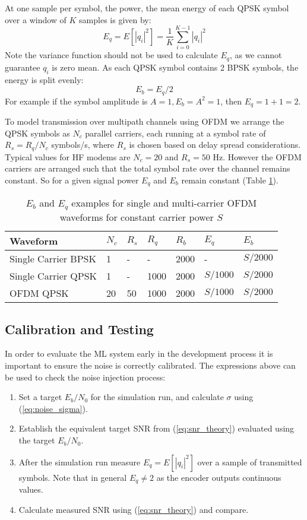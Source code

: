 \documentclass{article}
\begin{document}
At one sample per symbol, the power, the mean energy of each QPSK symbol over a window of $K$ samples is given by:
\begin{equation}
E_q = E[|q_i|^2] = \frac{1}{K}\sum_{i=0}^{K-1}|q_i|^2
\end{equation}
Note the variance function should not be used to calculate $E_q$, as we cannot guarantee $q_i$ is zero mean. As each QPSK symbol contains 2 BPSK symbols, the energy is split evenly:
\begin{equation}
E_b = E_q/2
\end{equation}
For example if the symbol amplitude is $A=1, E_b=A^2=1$, then $E_q=1+1=2$.

To model transmission over multipath channels using OFDM we arrange the QPSK symbols as $N_c$ parallel carriers, each running at a symbol rate of $R_s=R_q/N_c$ symbols/s, where $R_s$ is chosen based on delay spread considerations.  Typical values for HF modems are $N_c=20$ and $R_s=50$ Hz. However the OFDM carriers are arranged such that the total symbol rate over the channel remains constant.  So for a given signal power $E_q$ and $E_b$ remain constant (Table \ref{tab:constant_eb}).

\begin{table} [H]
\centering
\begin{tabular}{l l l l l l l}
 \hline
 Waveform            & $N_c$ & $R_s$ & $R_q$ & $R_b$ & $E_q$ & $E_b$ \\
 \hline
 Single Carrier BPSK & 1     & -  & -    & 2000  & -        & $S/2000$ \\
 Single Carrier QPSK & 1     & -  & 1000 & 2000  & $S/1000$ & $S/2000$ \\
 OFDM QPSK           & 20    & 50 & 1000 & 2000  & $S/1000$ & $S/2000$ \\
 \hline
\end{tabular}
\caption{$E_b$ and $E_q$ examples for single and multi-carrier OFDM waveforms for constant carrier power $S$}
\label{tab:constant_eb}
\end{table}

\subsection{Calibration and Testing}

In order to evaluate the ML system early in the development process it is important to ensure the noise is correctly calibrated. The expressions above can be used to check the noise injection process:
\begin{enumerate}
\item Set a target $E_b/N_0$ for the simulation run, and calculate $\sigma$ using (\ref{eq:noise_sigma}).
\item Establish the equivalent target SNR from (\ref{eq:snr_theory}) evaluated using the target $E_b/N_0$.
\item After the simulation run measure $E_q=E[|q_i|^2]$ over a sample of transmitted symbols.  Note that in general $E_q \ne 2$ as the encoder outputs continuous values.
\item Calculate measured SNR using (\ref{eq:snr_theory}) and compare.
\end{enumerate}
\end{document}
